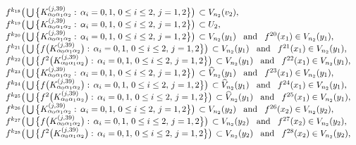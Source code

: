 \documentclass[12pt]{article}
\newcommand{\al}{\alpha}
\begin{document}
{\[\begin{array}{l}
\textrm{$f^{k_{18}}\big(\bigcup \big\{ K_{\al_0\al_1\al_2}^{(j,39)}: \, \al_i = 0, 1, \, 0 \le i \le 2, \, j = 1, 2 \big\}\big) \, \subset V_{n_2}(v_2)$,}\\
\textrm{$f^{k_{19}}\big(\bigcup \big\{ K_{\al_0\al_1\al_2}^{(j,39)}: \, \al_i = 0, 1, \, 0 \le i \le 2, \, j = 1, 2 \big\}\big) \, \subset U_2$,}\\
\textrm{$f^{k_{20}}\big(\bigcup \big\{ K_{\al_0\al_1\al_2}^{(j,39)}: \, \al_i = 0, 1, \, 0 \le i \le 2, \, j = 1, 2 \big\}\big) \, \subset V_{n_2}(y_1)$ \, \text{and} \, $f^{20}(x_1) \in V_{n_2}(y_1)$,}\\
\textrm{$f^{k_{21}}\big(\bigcup \big\{ f\big(K_{\al_0\al_1\al_2}^{(j,39)}\big): \, \al_i = 0, 1, \, 0 \le i \le 2, \, j = 1, 2 \big\}\big) \, \subset V_{n_2}(y_1)$ \, \text{and} \, $f^{21}(x_1) \in V_{n_2}(y_1)$,}\\
\textrm{$f^{k_{22}}\big(\bigcup \big\{ f^2\big(K_{\al_0\al_1\al_2}^{(j,39)}\big): \, \al_i = 0, 1, \, 0 \le i \le 2, \, j = 1, 2 \big\}\big) \, \subset V_{n_2}(y_1)$ \, \text{and} \, $f^{22}(x_1) \in V_{n_2}(y_1)$,}\\
\textrm{$f^{k_{23}}\big(\bigcup \big\{ K_{\al_0\al_1\al_2}^{(j,39)}: \, \al_i = 0, 1, \, 0 \le i \le 2, \, j = 1, 2 \big\}\big) \, \subset \widehat V_{n_2}(y_1)$ \, \text{and} \, $f^{23}(x_1) \in V_{n_2}(y_1)$,}\\
\textrm{$f^{k_{24}}\big(\bigcup \big\{ f\big(K_{\al_0\al_1\al_2}^{(j,39)}\big): \, \al_i = 0, 1, \, 0 \le i \le 2, \, j = 1, 2 \big\}\big) \, \subset \widehat V_{n_2}(y_1)$ \, \text{and} \, $f^{24}(x_1) \in V_{n_2}(y_1)$,}\\
\textrm{$f^{k_{25}}\big(\bigcup \big\{ f^2\big(K_{\al_0\al_1\al_2}^{(j,39)}\big): \, \al_i = 0, 1, \, 0 \le i \le 2, \, j = 1, 2 \big\}\big) \, \subset \widehat V_{n_2}(y_1)$ \, \text{and} \, $f^{25}(x_1) \in V_{n_2}(y_1)$,}\\
\textrm{$f^{k_{26}}\big(\bigcup \big\{ K_{\al_0\al_1\al_2}^{(j,39)}: \, \al_i = 0, 1, \, 0 \le i \le 2, \, j = 1, 2 \big\}\big) \, \subset V_{n_2}(y_2)$ \, \text{and} \, $f^{26}(x_2) \in V_{n_2}(y_2)$,}\\
\textrm{$f^{k_{27}}\big(\bigcup \big\{ f\big(K_{\al_0\al_1\al_2}^{(j,39)}\big): \, \al_i = 0, 1, \, 0 \le i \le 2, \, j = 1, 2 \big\}\big) \, \subset V_{n_2}(y_2)$ \, \text{and} \, $f^{27}(x_2) \in V_{n_2}(y_2)$,}\\
\textrm{$f^{k_{28}}\big(\bigcup \big\{ f^2\big(K_{\al_0\al_1\al_2}^{(j,39)}\big): \, \al_i = 0, 1, \, 0 \le i \le 2, \, j = 1, 2 \big\}\big) \, \subset V_{n_2}(y_2)$ \, \text{and} \, $f^{28}(x_2) \in V_{n_2}(y_2)$,}\\

\end{array}\]}
\end{document}
